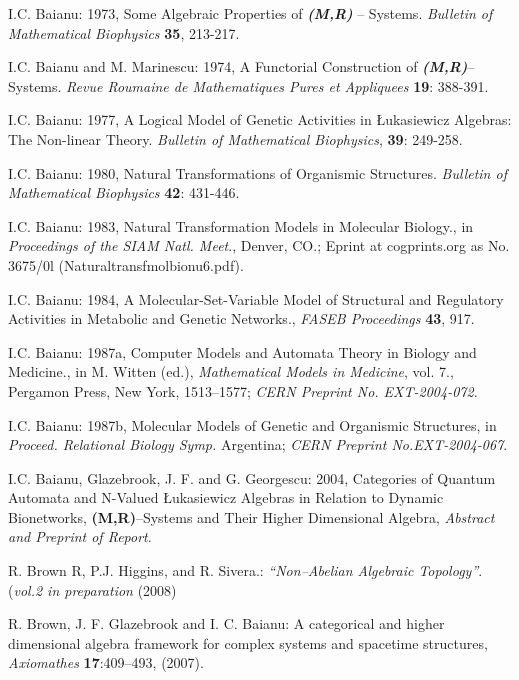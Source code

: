 \documentclass[12pt]{article}
\theoremstyle{plain}
\theoremstyle{definition}
\numberwithin{equation}{section}
\begin{document}
\begin{thebibliography}{99}
I.C. Baianu: 1973, Some Algebraic Properties of \emph{\textbf{(M,R)}} -- Systems. \emph{Bulletin of Mathematical Biophysics} \textbf{35}, 213-217.

I.C. Baianu and M. Marinescu: 1974, A Functorial Construction of \emph{\textbf{(M,R)}}-- Systems. \emph{Revue Roumaine de Mathematiques Pures et Appliquees} \textbf{19}: 388-391.

I.C. Baianu: 1977, A Logical Model of Genetic Activities in \L ukasiewicz Algebras: The Non-linear Theory. \emph{Bulletin of Mathematical Biophysics}, \textbf{39}: 249-258.

I.C. Baianu: 1980, Natural Transformations of Organismic Structures. \emph{Bulletin of Mathematical Biophysics}
\textbf{42}: 431-446.

I.C. Baianu: 1983, Natural Transformation Models in Molecular Biology., in \emph{Proceedings of the SIAM Natl. Meet}., Denver, CO.; Eprint at cogprints.org as No. 3675/0l (Naturaltransfmolbionu6.pdf).

I.C. Baianu: 1984, A Molecular-Set-Variable Model of Structural and Regulatory Activities in Metabolic and Genetic Networks., \emph{FASEB Proceedings} \textbf{43}, 917.

I.C. Baianu: 1987a, Computer Models and Automata Theory in Biology and Medicine.,  in M. Witten (ed.), 
\emph{Mathematical Models in Medicine}, vol. 7., Pergamon Press, New York, 1513--1577; \emph{CERN Preprint No. EXT-2004-072}. 

I.C. Baianu: 1987b, Molecular Models of Genetic and Organismic Structures, in \emph{Proceed. Relational Biology Symp.} Argentina; \emph{CERN Preprint No.EXT-2004-067}. 

I.C. Baianu, Glazebrook, J. F. and G. Georgescu: 2004, Categories of Quantum Automata and 
N-Valued \L ukasiewicz Algebras in Relation to Dynamic Bionetworks, \textbf{(M,R)}--Systems and
Their Higher Dimensional Algebra, \emph{Abstract and Preprint of Report}. 

R. Brown R, P.J. Higgins, and R. Sivera.: \textit{``Non--Abelian Algebraic Topology''}. (\textit{vol.2 in preparation}
(2008)

R. Brown, J. F. Glazebrook and I. C. Baianu: A categorical and higher dimensional algebra framework for complex systems and spacetime structures, \emph{Axiomathes} \textbf{17}:409--493, (2007).


\end{thebibliography}
\end{document}
